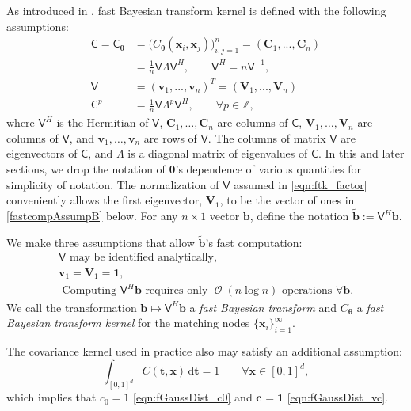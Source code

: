 \documentclass{svjour3}                     %
\DeclareMathOperator{\Order}{{\mathcal O}}
\newcommand{\bm}[1]{\boldsymbol{#1}}
\newcommand{\D}[1]{\text{d}{#1}}
\newcommand{\integers}{\mathbb{Z}}
\newcommand{\vtheta}{{\bm{\theta}}}
\newcommand{\vb}{\bm{b}}
\newcommand{\vc}{\bm{c}}
\newcommand{\vC}{\bm{C}}
\newcommand{\vt}{\bm{t}}
\newcommand{\vv}{\bm{v}}
\newcommand{\vV}{\bm{V}}
\newcommand{\vx}{\bm{x}}
\newcommand{\vone}{\bm{1}}
\newcommand{\mC}{\mathsf{C}}
\newcommand{\mCtheta}{{\mathsf{C}_{\vtheta}}}
\newcommand{\mLambda}{\mathsf{\Lambda}}
\newcommand{\mV}{\mathsf{V}}
\newcommand{\JRNote}[1]{{\textcolor{green}{JR: #1}}}
\begin{document}
As introduced in \cite{JagHic19a}, fast Bayesian transform kernel is defined with the following assumptions:
\begin{align}
\nonumber
\mC = \mCtheta &= \Big(C_\vtheta(\vx_i,\vx_j)\Big)_{i,j=1}^n  = (\vC_1,...,\vC_n) 
\\
\label{eqn:ftk_factor}
&= \frac 1n \mV \mLambda \mV^H , 
\quad \quad \mV^H = n \mV^{-1}, \\
\nonumber
\mV &= (\vv_1,...,\vv_n)^T = (\vV_1,...,\vV_n) \\
\nonumber
\mC^p  &= \frac 1n \mV \mLambda^{p} \mV^H, \qquad \forall p \in \integers,
\end{align}
where $\mV^H$ is the Hermitian of $\mV$, $\vC_1,\dots,\vC_n$ are columns of $\mC$,  $\vV_1,\dots,\vV_n$ are columns of $\mV$, and $\vv_1,\dots,\vv_n$ are rows of $\mV$. 
The columns of matrix $\mV$ are eigenvectors of $\mC$, and $\mLambda$ is a diagonal matrix of eigenvalues of $\mC$.
In this and later sections, we drop the notation of $\vtheta$'s dependence of various quantities for simplicity of notation.  The normalization of $\mV$ assumed in \eqref{eqn:ftk_factor} conveniently allows the first eigenvector, $\vV_1$, to be the vector of ones in \eqref{fastcompAssumpB} below.  
For any $n \times 1$ vector $\vb$, define the notation  $\widetilde{\vb} := \mV^H \vb$.


We make three assumptions that allow $\widetilde{\vb}$'s fast computation:
\begin{subequations} \label{fastcompAssump}
	\begin{gather}
	\label{fastcompAssumpA}
	\mV \text{ may be identified analytically}, \\
	\label{fastcompAssumpB}
	\vv_1 = \vV_1 = \vone, \\
	\label{fastcompAssumpC}
	\text{ Computing $\mV^H \vb$ requires only $\Order(n \log n)$ operations } \forall \vb.
	\end{gather}
\end{subequations}
We call the transformation $\vb \mapsto \mV^H \vb$ a \emph{fast Bayesian transform} and $C_\vtheta$ a \emph{fast Bayesian transform kernel} for the matching nodes $\{\vx_i\}_{i=1}^\infty$.  


The covariance kernel used in practice also may satisfy an additional assumption:
\begin{equation} \label{addAssump}
\int_{[0,1]^d} C(\vt,\vx) \, \D \vt = 1 \qquad \forall \vx \in [0,1]^d,
\end{equation}
which implies that $c_{0} = 1$ \eqref{eqn:fGaussDist_c0} and $\vc_{} = \vone$ 	\eqref{eqn:fGaussDist_vc}.  
\end{document}
